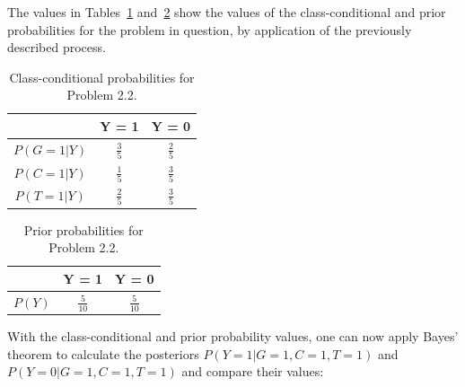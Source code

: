\documentclass[paper=a4, fontsize=11pt]{scrartcl} %
\numberwithin{equation}{section} %
\numberwithin{figure}{section} %
\numberwithin{table}{section} %
\newcommand\Tstrut{\rule{0pt}{2.6ex}}         %
\begin{document}
The values 
in Tables~\ref{tab:2-class-conditional} and~\ref{tab:2-priors} show the values 
of the class-conditional and prior probabilities for the problem in question, 
by application of the previously described process.\\

\begin{table}[h!]
\begin{center}
        \begin{tabularx}{0.3125\textwidth}{ c | c | c  }
                        & Y = 1 & Y = 0 \\ [0.5ex]
            \hline 
            $P(G = 1|Y)$    & $\frac{3}{5}$ \Tstrut     & $\frac{2}{5}$ \Tstrut   \\ [1.5ex]
            $P(C = 1|Y)$    & $\frac{1}{5}$      & $\frac{3}{5}$    \\ [1.5ex]
            $P(T = 1|Y)$    & $\frac{2}{5}$      & $\frac{3}{5}$    \\ [1.5ex]
        \end{tabularx}

    \caption{Class-conditional probabilities for Problem 2.2.}
    \label{tab:2-class-conditional}
    \end{center}
\end{table}

\begin{table}[h!]
\begin{center}
        \begin{tabularx}{0.25\textwidth}{ c | c | c  }
                        & Y = 1 & Y = 0 \\ [0.5ex]
            \hline 
            $P(Y)$    & $\frac{5}{10}$ \Tstrut     & $\frac{5}{10}$ \Tstrut   \\ [1.5ex]
        \end{tabularx}

    \caption{Prior probabilities for Problem 2.2.}
    \label{tab:2-priors}
    \end{center}
\end{table}

With the class-conditional and prior probability values, one can now apply 
Bayes' theorem to calculate the posteriors $P(Y = 1|G = 1, C = 1,T = 1)$ and 
$P(Y = 0|G = 1, C = 1,T = 1)$ and compare their values:
\end{document}
